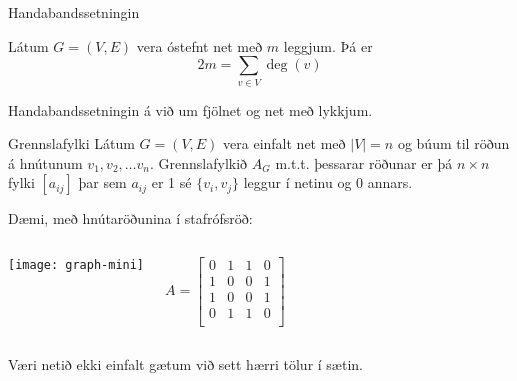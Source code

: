 \documentclass{beamer}
\begin{document}
\begin{frame}{Handabandssetningin}
	\begin{tcolorbox}[title=Handabandssetningin]
		Látum $G = (V, E)$ vera óstefnt net með $m$ leggjum. Þá er
		\[
			2m = \sum_{v \in V} \deg(v)
		\]
	\end{tcolorbox}
	Handabandssetningin  á við um fjölnet og net með lykkjum.
\end{frame}

\begin{frame}{Grennslafylki}
	Látum $G = (V, E)$ vera einfalt net með $|V| = n$ og búum til röðun á hnútunum $v_1, v_2, \ldots v_n$. Grennslafylkið $A_G$ m.t.t. þessarar röðunar er þá $n \times n$ fylki $[a_{ij}]$ þar sem $a_{ij}$ er 1 sé $\{v_i,v_j\}$ leggur í netinu og 0 annars.

	Dæmi, með hnútaröðunina í stafrófsröð:
	\begin{columns}
		\begin{center}
			\texttt{[image: graph-mini]}
		\end{center}
		\[
			A =
			\begin{bmatrix}
				0 & 1 & 1 & 0 \\
				1 & 0 & 0 & 1 \\
				1 & 0 & 0 & 1 \\
				0 & 1 & 1 & 0 \\
			\end{bmatrix}
		\]
	\end{columns}
	\vspace{0.2cm}
	Væri netið ekki einfalt gætum við sett hærri tölur í sætin.
\end{frame}
\end{document}
